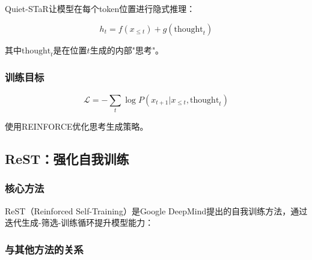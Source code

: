 \documentclass[12pt,a4paper]{article}
\newenvironment{algorithmic}[1][]%
      {\begin{list}{}{\leftmargin=2em\itemsep=0.2em\parsep=0pt\topsep=0.2em}}%
      {\end{list}}
\newcommand{\STATE}{\item[]}
\newcommand{\FOR}[1]{\item[]\textbf{for} ##1 \textbf{do}}
\newcommand{\ENDFOR}{\item[]\textbf{end for}}
\begin{document}
Quiet-STaR让模型在每个token位置进行隐式推理：

\begin{equation}
h_t = f(x_{\leq t}) + g(\text{thought}_t)
\end{equation}

其中$\text{thought}_t$是在位置$t$生成的内部"思考"。

\subsubsection{训练目标}

\begin{equation}
\mathcal{L} = -\sum_t \log P(x_{t+1} | x_{\leq t}, \text{thought}_t)
\end{equation}

使用REINFORCE优化思考生成策略。

\subsection{ReST：强化自我训练}

\subsubsection{核心方法}

ReST（Reinforced Self-Training）是Google DeepMind提出的自我训练方法，通过迭代生成-筛选-训练循环提升模型能力：


\subsubsection{与其他方法的关系}
\end{document}
